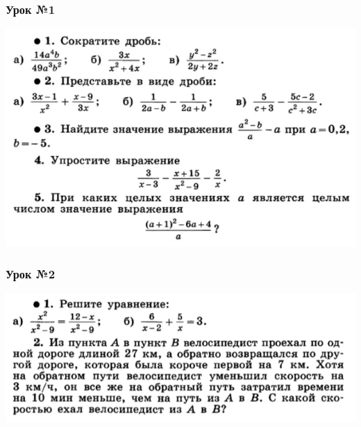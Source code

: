 \documentclass[algebra,a5paper]{pum}
\date{23.04.20}
\begin{document}
\subsubsection*{Урок №1}
\includegraphics[width=\textwidth]{img/14-1.png}

\subsubsection*{Урок №2}
\includegraphics[width=\textwidth]{img/14-2.png}
\end{document}
